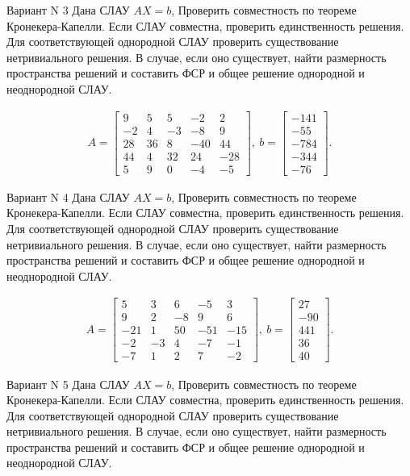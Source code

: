 \documentclass[11pt]{report}
\begin{document}
Вариант N 3
Дана СЛАУ $AX = b$,
Проверить совместность по теореме Кронекера-Капелли. Если СЛАУ совместна, проверить единственность решения.
Для соответствующей однородной СЛАУ проверить существование нетривиального решения. В случае, если оно существует,
найти размерность пространства решений и составить ФСР и общее решение однородной  и неоднородной СЛАУ.


\begin{align*}
 A = \left[\begin{matrix}9 & 5 & 5 & -2 & 2\\-2 & 4 & -3 & -8 & 9\\28 & 36 & 8 & -40 & 44\\44 & 4 & 32 & 24 & -28\\5 & 9 & 0 & -4 & -5\end{matrix}\right],
\ b = \left[\begin{matrix}-141\\-55\\-784\\-344\\-76\end{matrix}\right]. 
 \end{align*}

Вариант N 4
Дана СЛАУ $AX = b$,
Проверить совместность по теореме Кронекера-Капелли. Если СЛАУ совместна, проверить единственность решения.
Для соответствующей однородной СЛАУ проверить существование нетривиального решения. В случае, если оно существует,
найти размерность пространства решений и составить ФСР и общее решение однородной  и неоднородной СЛАУ.


\begin{align*}
 A = \left[\begin{matrix}5 & 3 & 6 & -5 & 3\\9 & 2 & -8 & 9 & 6\\-21 & 1 & 50 & -51 & -15\\-2 & -3 & 4 & -7 & -1\\-7 & 1 & 2 & 7 & -2\end{matrix}\right],
\ b = \left[\begin{matrix}27\\-90\\441\\36\\40\end{matrix}\right]. 
 \end{align*}

Вариант N 5
Дана СЛАУ $AX = b$,
Проверить совместность по теореме Кронекера-Капелли. Если СЛАУ совместна, проверить единственность решения.
Для соответствующей однородной СЛАУ проверить существование нетривиального решения. В случае, если оно существует,
найти размерность пространства решений и составить ФСР и общее решение однородной  и неоднородной СЛАУ.
\end{document}
